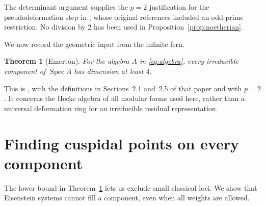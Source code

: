 \documentclass[11pt]{article}
\newtheorem{theorem}{Theorem}[section]
\theoremstyle{remark}
\numberwithin{equation}{section}
\DeclareMathOperator{\Spec}{Spec}
\begin{document}
The determinant argument supplies the $p=2$ justification for the
pseudodeformation step in \cite[Theorem~2.7]{Emerton11}, whose
original references included an odd-prime restriction. No division
by $2$ has been used in Proposition~\ref{prop:noetherian}.

We now record the geometric input from the infinite fern.
\begin{theorem}[Emerton]\label{thm:lower}
For the algebra $A$ in \eqref{eq:algebra}, every irreducible component
of $\Spec A$ has dimension at least $4$.
\end{theorem}
This is \cite[Corollary~2.28]{Emerton11}, with the definitions in
Sections~2.1 and~2.5 of that paper and with $p=2$. It concerns the
Hecke algebra of all modular forms used here, rather than a
universal deformation ring for an irreducible residual
representation.

\section{Finding cuspidal points on every component}
\label{sec:eisenstein}

The lower bound in Theorem~\ref{thm:lower} lets us exclude small
classical loci. We show that Eisenstein systems cannot fill a
component, even when all weights are allowed.
\end{document}
